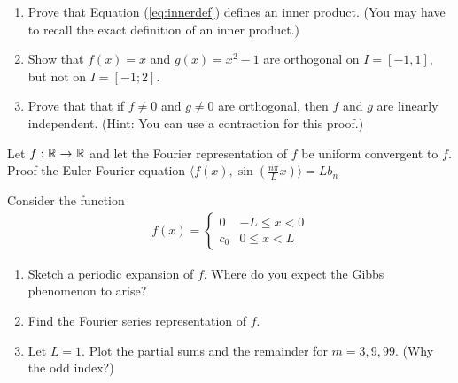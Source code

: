\vspace{2cm}

\begin{exerciseregion}
	\begin{exercise}
		\begin{enumerate}
			\item Prove that Equation (\ref{eq:innerdef}) defines an inner product. (You may have 
				to recall the exact definition of an inner product.) 
			\item Show that $f(x) = x$ and $g(x)=x^2 - 1$ are orthogonal on $I=[-1,1]$, 
				but not on $I=[-1;2]$. 
			\item Prove that that if $f\neq0$ and $g\neq0$ are orthogonal, then $f$ and $g$ are
				linearly independent. (Hint: You can use a contraction for this proof.)
		\end{enumerate}		
	\end{exercise}

	\begin{exercise}
		Let $f:\mathbb{R} \rightarrow \mathbb{R}$ and let the Fourier representation of $f$ be uniform convergent
		to $f$. Proof the Euler-Fourier equation $ \langle f(x),
		\sin\left(\frac{n\pi}{L}x\right)\rangle = Lb_n$
	\end{exercise}
		
	\begin{exercise}
		Consider the function
		\begin{eqnarray}
			f(x) = 
			\begin{cases} 
			      0 & -L \leq x < 0 \\
				  c_0 & 0 \leq x < L
   			\end{cases}
		\end{eqnarray}
		\begin{enumerate}
			\item Sketch a periodic expansion of $f$.  Where do you expect the
				Gibbs phenomenon to arise?
			\item Find the Fourier series representation of $f$.
			\item Let $L=1$. Plot the partial sums and the remainder for $m=3,9,99$. (Why the odd index?)
		\end{enumerate}			
	\end{exercise}


\end{exerciseregion}
